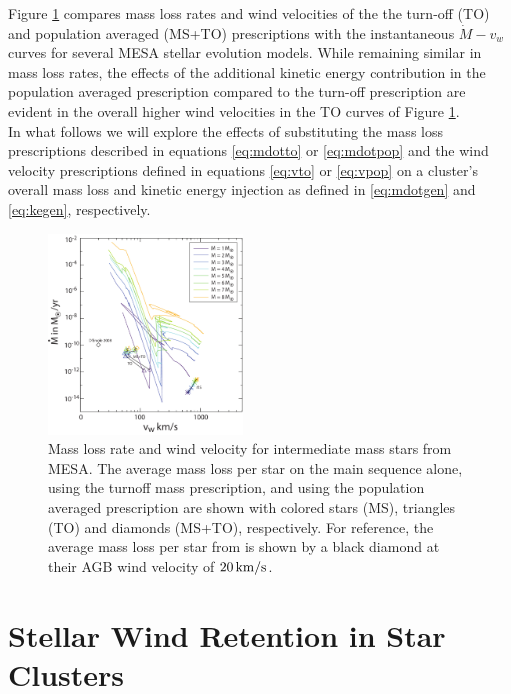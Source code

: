 \documentclass[fleqn,usenatbib]{mnras}
\begin{document}
Figure \ref{fig:fullmassloss} compares mass loss rates and wind velocities of the the turn-off (TO) and population averaged (MS+TO) prescriptions with the instantaneous $\dot{M}-v_w$ curves for several MESA stellar evolution models.  While remaining similar in mass loss rates, the effects of the additional kinetic energy contribution in the population averaged prescription compared to the turn-off prescription are evident in the overall higher wind velocities in the TO curves of Figure \ref{fig:fullmassloss}.\\

In what follows we will explore the effects of substituting the mass loss prescriptions described in equations \ref{eq:mdotto} or \ref{eq:mdotpop} and the wind velocity prescriptions defined in equations \ref{eq:vto} or \ref{eq:vpop} on a cluster's overall mass loss and kinetic energy injection as defined in \ref{eq:mdotgen} and \ref{eq:kegen}, respectively.

\begin{figure}
\centering\includegraphics[width=0.46\textwidth]{mdotvwtracks.pdf}
\caption{ Mass loss rate and wind velocity for intermediate mass stars from MESA.  The average mass loss per star on the main sequence alone, using the turnoff mass prescription, and using the population averaged prescription are shown with colored stars (MS), triangles (TO) and diamonds (MS+TO), respectively.  For reference, the average mass loss per star from \citep{dercole2008} is shown by a black diamond at their AGB wind velocity of $20 \, {\rm km/s}$.}
\label{fig:fullmassloss}
\end{figure} 





\section{Stellar Wind Retention in Star Clusters} \label{section:results}
\end{document}
